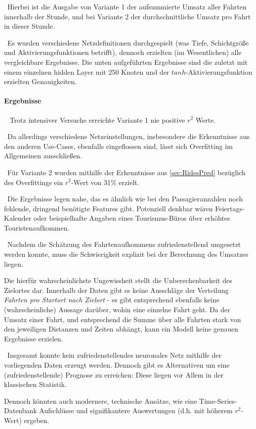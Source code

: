 ~\newline Hierbei ist die Ausgabe von Variante 1 der aufsummierte Umsatz aller Fahrten innerhalb der Stunde, und bei Variante 2 der durchschnittliche Umsatz pro Fahrt in dieser Stunde. 

~\newline Es wurden verschiedene Netzdefinitionen durchgespielt (was Tiefe, Schichtgröße und Aktivierungsfunktionen betrifft), dennoch erzielten (im Wesentlichen) alle vergleichbare Ergebnisse. Die unten aufgeführten Ergebnisse sind die zuletzt mit einem einzelnen hidden Layer mit 250 Knoten und der $tanh$-Aktivierungsfunktion erzielten Genauigkeiten.
\paragraph{Ergebnisse} ~\newline
Trotz intensiver Versuche erreichte Variante 1 nie positive $r^2$ Werte. 

~\newline Da allerdings verschiedene Netzeinstellungen, insbesondere die Erkenntnisse aus den anderen Use-Cases, ebenfalls eingeflossen sind, lässt sich Overfitting im Allgemeinen ausschließen. 

~\newline Für Variante 2 wurden mithilfe der Erkenntnisse aus \ref{sec:RidesPred} bezüglich des Overfittings ein $r^2$-Wert von 31\% erzielt.

~\newline Die Ergebnisse legen nahe, das es ähnlich wie bei den Passagieranzahlen noch fehlende, dringend benötigte Features gibt. Potenziell denkbar wären Feiertags-Kalender oder beispielhafte Angaben eines Tourismus-Büros über erhöhtes Touristenaufkommen.  

~\newline Nachdem die Schätzung des Fahrtenaufkommens zufriedenstellend umgesetzt werden konnte, muss die Schwierigkeit explizit bei der Berechnung des Umsatzes liegen. 

Die hierfür wahrscheinlichste Ungewissheit stellt die Unberechenbarkeit des Zielortes dar. Innerhalb der Daten gibt es keine Ausschläge der Verteilung \textit{Fahrten pro Startort nach Zielort} - es gibt entsprechend ebenfalls keine (wahrscheinliche) Aussage darüber, wohin eine einzelne Fahrt geht. Da der Umsatz einer Fahrt, und entsprechend die Summe über alle Fahrten stark von den jeweiligen Distanzen und Zeiten abhängt, kann ein Modell keine genauen Ergebnisse erzielen.

~\newline Insgesamt konnte kein zufriedenstellendes neuronales Netz mithilfe der vorliegenden Daten erzeugt werden. Dennoch gibt es Alternativen um eine (zufriedenstellende) Prognose zu erreichen: Diese liegen vor Allem in der klassischen Statistik. 

Dennoch könnten auch modernere, technische Ansätze, wie eine Time-Series-Datenbank Aufschlüsse und signifikantere Auswertungen (d.h. mit höherem $r^2$-Wert) ergeben.  